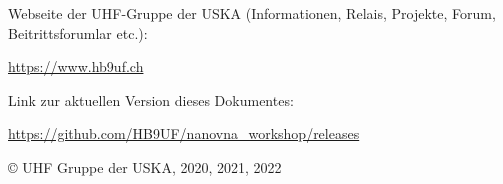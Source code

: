 \documentclass[twoside,a4paper,11pt,halfparskip,DIV=11,notitlepage]{scrartcl}
\begin{document}
\begin{titlepage}
\vfill
{}
\vfill
\clearpage
\vspace*{\fill}
\parbox{0.6\textwidth}{\scriptsize Webseite der UHF-Gruppe der USKA (Informationen, Relais, Projekte, Forum, Beitrittsforumlar etc.):\par
\url{https://www.hb9uf.ch}
}

\vspace{1cm}

\parbox{0.6\textwidth}{\scriptsize Link zur aktuellen Version dieses Dokumentes:\par
\url{https://github.com/HB9UF/nanovna_workshop/releases}
}

\vspace{1cm}

\scriptsize © UHF Gruppe der USKA, 2020, 2021, 2022
\end{titlepage}





\cleardoublepage

\maketitle

\setcounter{tocdepth}{1}
\tableofcontents



\newpage

\end{document}
